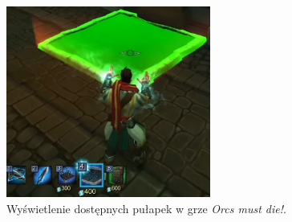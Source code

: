 \begin{figure}[h!tbp]
    \centering
    \includegraphics[width=0.6\textwidth]{images/ui/buoildingsOrcs.png}
    \caption[Wyświetlenie dostępnych pułapek w grze \textit{Orcs must die!}.]{Wyświetlenie dostępnych pułapek w grze \textit{Orcs must die!}\protect\footnotemark.}\label{fig:Orcs}
\end{figure}
